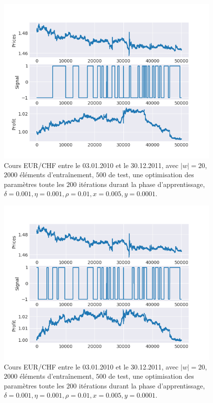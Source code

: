 \documentclass[a4paper, 11pt]{article}
\begin{document}
\begin{figure}[H]
\centering
\includegraphics[]{images/res/eurchf_1.png}
\caption[Blup]{Cours EUR/CHF entre le 03.01.2010 et le 30.12.2011, avec $|w| = 20$, $2000$ éléments d'entraînement, $500$ de test, une optimisation des
paramètres toute les $200$ itérations durant la phase d'apprentissage, $\delta = 0.001, \eta=0.001,\rho=0.01, x = 0.005, y=0.0001$.}
\end{figure}

 \begin{figure}[H]
\centering
\includegraphics[]{images/res/eurchf_2.png}
\caption[Blup]{Cours EUR/CHF entre le 03.01.2010 et le 30.12.2011, avec $|w| = 20$, $2000$ éléments d'entraînement, $500$ de test, une optimisation des
paramètres toute les $200$ itérations durant la phase d'apprentissage, $\delta = 0.001, \eta=0.001,\rho=0.01, x = 0.005, y=0.0001$.}
\end{figure}
\end{document}
